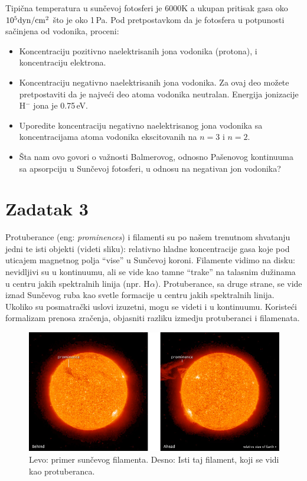 \documentclass[12pt]{article}
\begin{document}
Tipi\v{c}na temperatura u sun\v{c}evoj fotosferi je 6000K a ukupan pritisak gasa oko $10^5 {\rm dyn/cm^2}$ \v{s}to je oko 1\,Pa. Pod pretpostavkom da je fotosfera u potpunosti sa\v{c}injena od vodonika, proceni:
\begin{itemize}
    \item Koncentraciju pozitivno naelektrisanih jona vodonika (protona), i koncentraciju elektrona.
    \item Koncentraciju negativno naelektrisanih jona vodonika. Za ovaj deo mo\v{z}ete pretpostaviti da je najve\'{c}i deo atoma vodonika neutralan. Energija jonizacije H$^-$ jona je 0.75\,eV.
    \item Uporedite koncentraciju negativno naelektrisanog jona vodonika sa koncentracijama atoma vodonika ekscitovanih na $n=3$ i $n=2$.
    \item \v{S}ta nam ovo govori o va\v{z}nosti Balmerovog, odnosno Pa\v{s}enovog kontinuuma sa apsorpciju u Sun\v{c}evoj fotosferi, u odnosu na negativan jon vodonika?
\end{itemize}

\section*{Zadatak 3}

Protuberance (eng: \emph{prominences}) i filamenti su po na\v{s}em trenutnom shvatanju jedni te isti objekti (videti sliku): relativno hladne koncentracije gasa koje pod uticajem magnetnog polja ``vise'' u Sun\v{c}evoj koroni. Filamente vidimo na disku: nevidljivi su u kontinuumu, ali se vide kao tamne ``trake'' na talasnim du\v{z}inama u centru jakih spektralnih linija (npr. H$\alpha$). Protuberance, sa druge strane, se vide iznad Sun\v{c}evog ruba kao svetle formacije u centru jakih spektralnih linija. Ukoliko su posmatra\v{c}ki uslovi izuzetni, mogu se videti i u kontinuumu. Koriste\'{c}i formalizam prenosa zra\v{c}enja, objasniti razliku izmedju protuberanci i filamenata.

\begin{figure}
\includegraphics[width=\textwidth]{prominence.jpg}
\caption{Levo: primer sun\v{c}evog filamenta. Desno: Isti taj filament, koji se vidi kao protuberanca.}
\end{figure}
\end{document}
